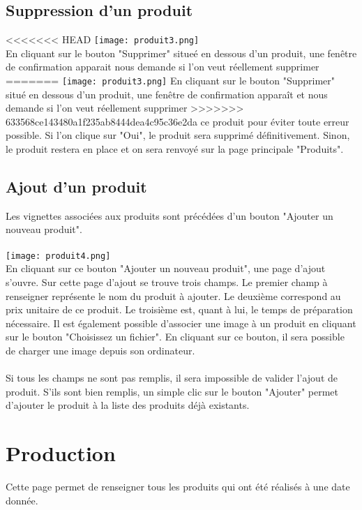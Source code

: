 \subsection{Suppression d'un produit}
<<<<<<< HEAD
\texttt{[image: produit3.png]}\\
En cliquant sur le bouton "Supprimer" situeé en dessous d'un produit, une 
fenêtre de confirmation apparait nous demande si l'on veut réellement supprimer 
=======
\texttt{[image: produit3.png]}
En cliquant sur le bouton "Supprimer" situé en dessous d'un produit, une 
fenêtre de confirmation apparaît et nous demande si l'on veut réellement supprimer 
>>>>>>> 633568ce143480a1f235ab8444dea4c95c36e2da
ce produit pour éviter toute erreur possible. Si l'on clique sur "Oui", le 
produit sera supprimé définitivement. Sinon, le produit restera en place et on 
sera renvoyé sur la page principale "Produits".


\subsection{Ajout d'un produit}
Les vignettes associées aux produits sont précédées d'un bouton "Ajouter un 
nouveau produit".

\paragraph{}
\texttt{[image: produit4.png]}\\
En cliquant sur ce bouton "Ajouter un nouveau produit", une page d'ajout s'ouvre.
Sur cette page d'ajout se trouve trois champs. Le premier champ à renseigner 
représente le nom du produit à ajouter. Le deuxième correspond au prix unitaire 
de ce produit. Le troisième est, quant à lui, le temps de préparation nécessaire.
Il est également possible d'associer une image à un produit en cliquant sur le 
bouton "Choisissez un fichier". En cliquant sur ce bouton, il sera possible de 
charger une image depuis son ordinateur.

\paragraph{}
Si tous les champs ne sont pas remplis, il sera impossible de valider l'ajout de 
produit. S'ils sont bien remplis, un simple clic sur le bouton "Ajouter" 
permet d'ajouter le produit à la liste des produits déjà existants. 



\section{Production}
Cette page permet de renseigner tous les produits qui ont été réalisés à une date 
donnée.

